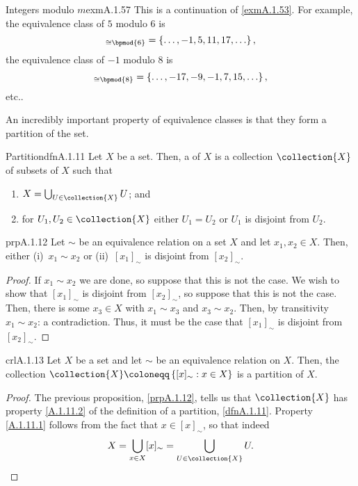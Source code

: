 \begin{exm}{Integers modulo $m$}{exmA.1.57}
This is a continuation of \cref{exmA.1.53}.  For example, the equivalence class of $5$ modulo $6$ is
\begin{equation}
[5]_{\cong \bpmod{6}}=\left\{ \ldots ,-1,5,11,17,\ldots \right\} ,
\end{equation}
the equivalence class of $-1$ modulo $8$ is
\begin{equation}
[1]_{\cong \bpmod{8}}=\left\{ \ldots ,-17,-9,-1,7,15,\ldots \right\} ,
\end{equation}
etc..
\end{exm}
An incredibly important property of equivalence classes is that they form a partition of the set.
\begin{dfn}{Partition}{dfnA.1.11}
Let $X$ be a set.  Then, a  of $X$ is a collection $\collection{X}$ of subsets of $X$ such that
\begin{enumerate}
\item \label{A.1.11.1}$X=\bigcup _{U\in \collection{X}}U$; and
\item \label{A.1.11.2}for $U_1,U_2\in \collection{X}$ either $U_1=U_2$ or $U_1$ is disjoint from $U_2$.
\end{enumerate}
\end{dfn}
\begin{prp}{}{prpA.1.12}
Let $\sim$ be an equivalence relation on a set $X$ and let $x_1,x_2\in X$.  Then, either (i)~$x_1\sim x_2$ or (ii)~$[x_1]_\sim$ is disjoint from $[x_2]_\sim$.
\begin{proof}
If $x_1\sim x_2$ we are done, so suppose that this is not the case.  We wish to show that $[x_1]_\sim$ is disjoint from $[x_2]_\sim$, so suppose that this is not the case.  Then, there is some $x_3\in X$ with $x_1\sim x_3$ and $x_3\sim x_2$.  Then, by transitivity $x_1\sim x_2$:  a contradiction.  Thus, it must be the case that $[x_1]_\sim$ is disjoint from $[x_2]_\sim$.
\end{proof}
\end{prp}
\begin{crl}{}{crlA.1.13}
Let $X$ be a set and let $\sim$ be an equivalence relation on $X$.  Then, the collection $\collection{X}\coloneqq \left\{ [x]_\sim :x\in X\right\}$ is a partition of $X$.
\begin{proof}
The previous proposition, \cref{prpA.1.12}, tells us that $\collection{X}$ has property \cref{A.1.11.2} of the definition of a partition, \cref{dfnA.1.11}.  Property \cref{A.1.11.1} follows from the fact that $x\in [x]_\sim$, so that indeed
\begin{equation}
X=\bigcup _{x\in X}[x]_\sim =\bigcup _{U\in \collection{X}}U.
\end{equation}
\end{proof}
\end{crl}
